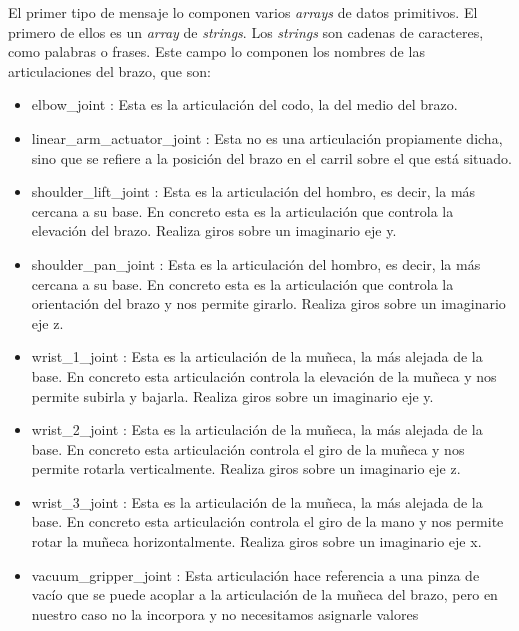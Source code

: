 El primer tipo de mensaje lo componen varios \textit{arrays} de datos primitivos. El primero de ellos es un \textit{array} de \textit{strings}. Los \textit{strings} son cadenas de caracteres, como palabras o frases. Este campo lo componen los nombres de las articulaciones del brazo, que son:
\begin{itemize}
	\item elbow\_joint : Esta es la articulación del codo, la del medio del brazo.
	
	\item linear\_arm\_actuator\_joint : Esta no es una articulación propiamente dicha, sino que se refiere a la posición del brazo en el carril sobre el que está situado.
	
	\item shoulder\_lift\_joint : Esta es la articulación del hombro, es decir, la más cercana a su base. En concreto esta es la articulación que controla la elevación del brazo. Realiza giros sobre un imaginario eje y.
	
	\item shoulder\_pan\_joint : Esta es la articulación del hombro, es decir, la más cercana a su base. En concreto esta es la articulación que controla la orientación del brazo y nos permite girarlo. Realiza giros sobre un imaginario eje z.
	
	\item wrist\_1\_joint : Esta es la articulación de la muñeca, la más alejada de la base. En concreto esta articulación controla la elevación de la muñeca y nos permite subirla y bajarla. Realiza giros sobre un imaginario eje y.
	
	\item wrist\_2\_joint : Esta es la articulación de la muñeca, la más alejada de la base. En concreto esta articulación controla el giro de la muñeca y nos permite rotarla verticalmente. Realiza giros sobre un imaginario eje z.
	
	\item wrist\_3\_joint : Esta es la articulación de la muñeca, la más alejada de la base. En concreto esta articulación controla el giro de la mano y nos permite rotar la muñeca horizontalmente. Realiza giros sobre un imaginario eje x.
	
	\item vacuum\_gripper\_joint : Esta articulación hace referencia a una pinza de vacío que se puede acoplar a la articulación de la muñeca del brazo, pero en nuestro caso no la incorpora y no necesitamos asignarle valores
\end{itemize}

